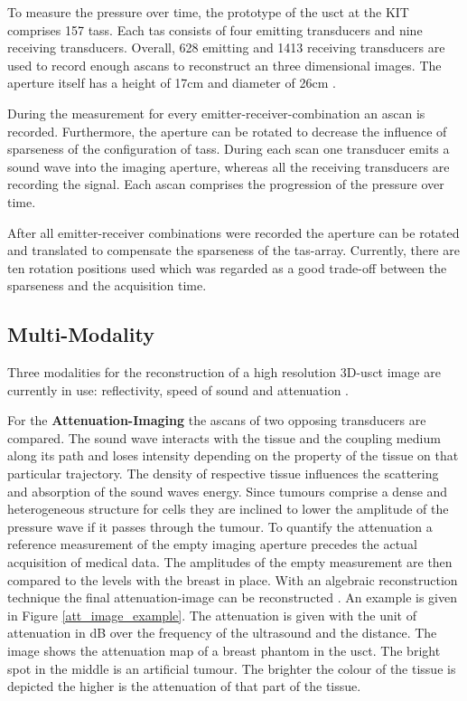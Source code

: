 To measure the pressure over time, the prototype of the \ac{usct} at the KIT comprises 157 \acp{tas}. Each \ac{tas} consists of four emitting transducers and nine receiving transducers. Overall, 628 emitting and 1413 receiving transducers are used to record enough \acp{ascan} to reconstruct an three dimensional images. The aperture itself has a height of 17cm and diameter of 26cm \cite{Kretzek2014GPUAberration}.

During the measurement for every emitter-receiver-combination an \ac{ascan} is recorded. Furthermore, the aperture can be rotated to decrease the influence of sparseness of the configuration of \acp{tas}. During each scan one transducer emits a sound wave into the imaging aperture, whereas all the receiving transducers are recording the signal. Each \ac{ascan} comprises the progression of the pressure over time.

After all emitter-receiver combinations were recorded the aperture can be rotated and translated to compensate the sparseness of the \ac{tas}-array. Currently, there are ten rotation positions used which was regarded as a good trade-off between the sparseness and the acquisition time.







\subsection{Multi-Modality}
\label{sec:multimodality}

Three modalities for the reconstruction of a high resolution 3D-\ac{usct} image are currently in use: reflectivity, speed of sound and attenuation \cite{Jirik2012Sound-speedTomography}.

For the \textbf{Attenuation-Imaging} the \acp{ascan} of two opposing transducers are compared. The sound wave interacts with the tissue and the coupling medium along its path and loses intensity depending on the property of the tissue on that particular trajectory. The density of respective tissue influences the scattering and absorption of the sound waves energy. Since tumours comprise a dense and heterogeneous structure for cells they are inclined to lower the amplitude of the pressure wave if it passes through the tumour. To quantify the attenuation a reference measurement of the empty imaging aperture precedes the actual acquisition of medical data. The amplitudes of the empty measurement are then compared to the levels with the breast in place. With an algebraic reconstruction technique the final attenuation-image can be reconstructed \cite{Dapp2011Geometry-independentInformation}. An example is given in Figure \ref{att_image_example}. The attenuation is given with the unit of attenuation in dB over the frequency of the ultrasound and the distance. The image shows the attenuation map of a breast phantom in the \ac{usct}. The bright spot in the middle is an artificial tumour. The brighter the colour of the tissue is depicted the higher is the attenuation of that part of the tissue.


